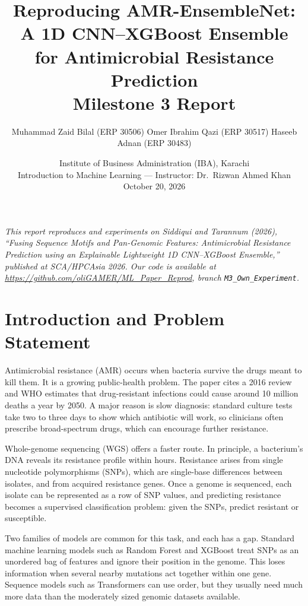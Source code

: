 \documentclass[11pt]{article}
\title{\textbf{Reproducing AMR-EnsembleNet: A 1D CNN--XGBoost Ensemble\\
for Antimicrobial Resistance Prediction}\\
\large Milestone 3 Report}
\author{
Muhammad Zaid Bilal (ERP 30506) \quad
Omer Ibrahim Qazi (ERP 30517) \quad
Haseeb Adnan (ERP 30483)
}
\date{%
Institute of Business Administration (IBA), Karachi \\
Introduction to Machine Learning --- Instructor: Dr.\ Rizwan Ahmed Khan \\
October 20, 2026
}
\begin{document}
\maketitle

\noindent\textit{This report reproduces and experiments on Siddiqui and Tarannum (2026), ``Fusing Sequence Motifs and Pan-Genomic Features: Antimicrobial Resistance Prediction using an Explainable Lightweight 1D CNN--XGBoost Ensemble,'' published at SCA/HPCAsia 2026. Our code is available at \url{https://github.com/oliGAMER/ML_Paper_Reprod}, branch \texttt{M3\_Own\_Experiment}.}

\vspace{1em}

\section{Introduction and Problem Statement}

Antimicrobial resistance (AMR) occurs when bacteria survive the drugs meant to kill them. It is a growing public-health problem. The paper cites a 2016 review and WHO estimates that drug-resistant infections could cause around 10 million deaths a year by 2050. A major reason is slow diagnosis: standard culture tests take two to three days to show which antibiotic will work, so clinicians often prescribe broad-spectrum drugs, which can encourage further resistance.

Whole-genome sequencing (WGS) offers a faster route. In principle, a bacterium's DNA reveals its resistance profile within hours. Resistance arises from single nucleotide polymorphisms (SNPs), which are single-base differences between isolates, and from acquired resistance genes. Once a genome is sequenced, each isolate can be represented as a row of SNP values, and predicting resistance becomes a supervised classification problem: given the SNPs, predict resistant or susceptible.

Two families of models are common for this task, and each has a gap. Standard machine learning models such as Random Forest and XGBoost treat SNPs as an unordered bag of features and ignore their position in the genome. This loses information when several nearby mutations act together within one gene. Sequence models such as Transformers can use order, but they usually need much more data than the moderately sized genomic datasets available.
\end{document}
